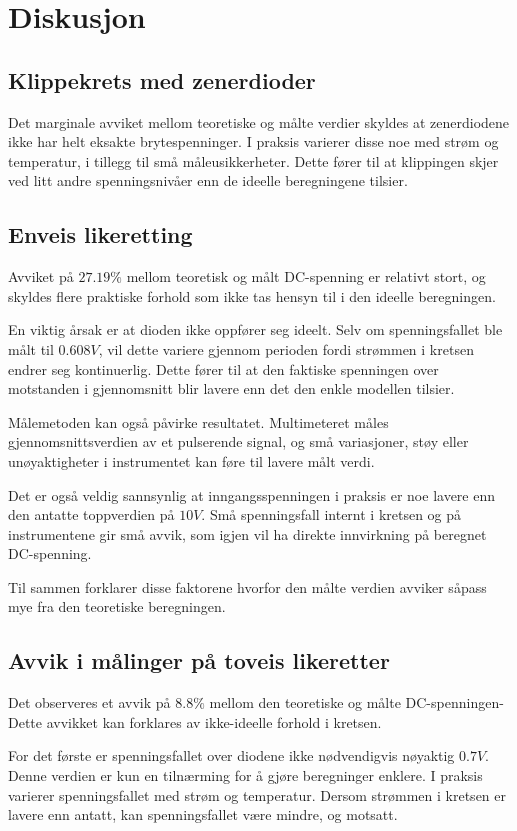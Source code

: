 \section{Diskusjon}
    \subsection{Klippekrets med zenerdioder}
        Det marginale avviket mellom teoretiske og målte verdier skyldes at zenerdiodene ikke har helt eksakte brytespenninger. I praksis varierer disse noe med strøm og temperatur, i tillegg til små måleusikkerheter. Dette fører til at klippingen skjer ved litt andre spenningsnivåer enn de ideelle beregningene tilsier. 
    \subsection{Enveis likeretting}
        Avviket på $27.19\%$ mellom teoretisk og målt DC-spenning er relativt stort, og skyldes flere praktiske forhold som ikke tas hensyn til i den ideelle beregningen.

        En viktig årsak er at dioden ikke oppfører seg ideelt. Selv om spenningsfallet ble målt til $0.608V$, vil dette variere gjennom perioden fordi strømmen i kretsen endrer seg kontinuerlig.
        Dette fører til at den faktiske spenningen over motstanden i gjennomsnitt blir lavere enn det den enkle modellen tilsier.

        Målemetoden kan også påvirke resultatet. Multimeteret måles gjennomsnittsverdien av et pulserende signal, og  små variasjoner, støy eller unøyaktigheter i instrumentet kan føre til lavere målt verdi.

        Det er også veldig sannsynlig at inngangsspenningen i praksis er noe lavere enn den antatte toppverdien på $10V$. Små spenningsfall internt i kretsen og på instrumentene gir små avvik, som igjen vil ha direkte innvirkning på beregnet DC-spenning. 

        Til sammen forklarer disse faktorene hvorfor den målte verdien avviker såpass mye fra den teoretiske beregningen. 
    \subsection{Avvik i målinger på toveis likeretter}
        Det observeres et avvik på $8.8\%$ mellom den teoretiske og målte DC-spenningen- Dette avvikket kan forklares av ikke-ideelle forhold i kretsen. 

        For det første er spenningsfallet over diodene ikke nødvendigvis nøyaktig $0.7V$. Denne verdien er kun en tilnærming for å gjøre beregninger enklere. I praksis varierer spenningsfallet med strøm og temperatur. Dersom strømmen i kretsen er lavere enn antatt, kan spenningsfallet være mindre, og motsatt.

